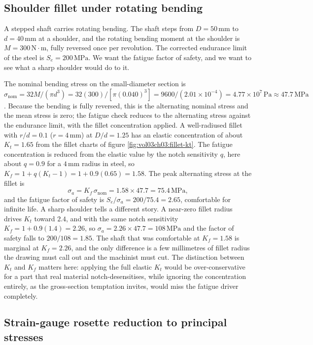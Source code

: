\subsection{Shoulder fillet under rotating bending}

A stepped shaft carries rotating bending. The shaft steps from $D = 50\,
\si{\milli\meter}$ to $d = 40\,\si{\milli\meter}$ at a shoulder, and the
rotating bending moment at the shoulder is $M = 300\,\text{N}\cdot
\text{m}$, fully reversed once per revolution. The corrected endurance
limit of the steel is $S_e = 200\,\text{MPa}$. We want the fatigue factor
of safety, and we want to see what a sharp shoulder would do to it.

The nominal bending stress on the small-diameter section is $\sigma_
{\text{nom}} = 32M/(\pi d^3) = 32(300)/[\pi(0.040)^3] = 9600/(2.01\times
10^{-4}) = 4.77\times 10^7\,\text{Pa} \approx 47.7\,\text{MPa}$. Because
the bending is fully reversed, this is the alternating nominal stress and
the mean stress is zero; the fatigue check reduces to the alternating
stress against the endurance limit, with the fillet concentration
applied. A well-radiused fillet with $r/d = 0.1$ ($r = 4\,\si{\milli
\meter}$) at $D/d = 1.25$ has an elastic concentration of about $K_t =
1.65$ from the fillet charts of figure \ref{fig:vol03ch03:fillet-kt}. The
fatigue concentration is reduced from the elastic value by the notch
sensitivity $q$, here about $q = 0.9$ for a $4\,\si{\milli\meter}$ radius
in steel, so $K_f = 1 + q(K_t - 1) = 1 + 0.9(0.65) = 1.58$. The peak
alternating stress at the fillet is
\[
\sigma_a = K_f\,\sigma_{\text{nom}} = 1.58 \times 47.7 = 75.4\,\text{MPa},
\]
and the fatigue factor of safety is $S_e/\sigma_a = 200/75.4 = 2.65$,
comfortable for infinite life. A sharp shoulder tells a different story.
A near-zero fillet radius drives $K_t$ toward $2.4$, and with the same
notch sensitivity $K_f = 1 + 0.9(1.4) = 2.26$, so $\sigma_a = 2.26 \times
47.7 = 108\,\text{MPa}$ and the factor of safety falls to $200/108 =
1.85$. The shaft that was comfortable at $K_f = 1.58$ is marginal at
$K_f = 2.26$, and the only difference is a few millimetres of fillet
radius the drawing must call out and the machinist must cut. The
distinction between $K_t$ and $K_f$ matters here: applying the full
elastic $K_t$ would be over-conservative for a part that real material
notch-desensitises, while ignoring the concentration entirely, as the
gross-section temptation invites, would miss the fatigue driver
completely.

\subsection{Strain-gauge rosette reduction to principal stresses}

